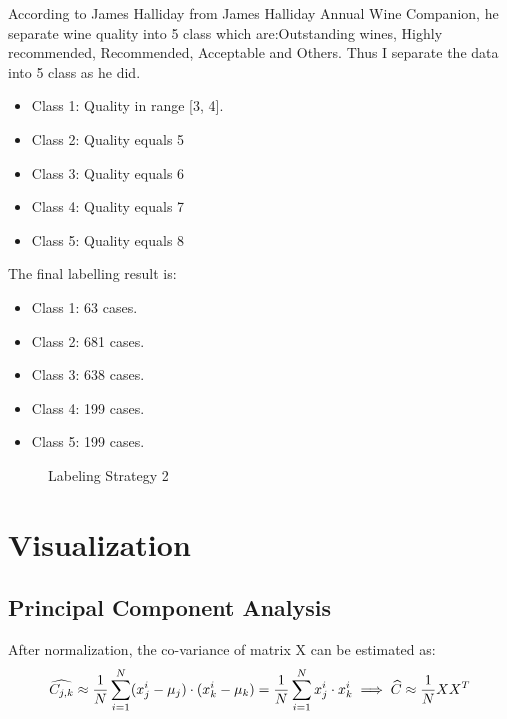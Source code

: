 \documentclass[titlepage,a4paper,12pt,thmsb]{report}
\begin{document}
According to James Halliday from James Halliday Annual Wine Companion, he separate wine quality into 5 class which are:Outstanding wines, Highly recommended, Recommended, Acceptable and Others. Thus I separate the data into 5 class as he did.
\begin{itemize}
\item{Class 1:  Quality in range [3, 4].}
\item{Class 2:  Quality equals 5}
\item{Class 3:  Quality equals 6}
\item{Class 4:  Quality equals 7}
\item{Class 5:  Quality equals 8}
\end{itemize}

The final labelling result is:

\begin{itemize}
\item{Class 1: 63 cases.}
\item{Class 2: 681 cases.}
\item{Class 3: 638 cases.}
\item{Class 4: 199 cases.}
\item{Class 5: 199 cases.}
\end{itemize}
\newpage
\begin{center}
\begin{figure}[hbtp]
{\par}
\caption{ Labeling Strategy 2}
\end{figure}
{}
\end{center}


\newpage

\section{Visualization}

\subsection{Principal Component Analysis}


After normalization, the co-variance of matrix X can be estimated as:
$$
  \widehat{C_{j,k}} \approx \frac{1}{N} \sum_{i=1}^{N} (x_j^i - \mu _j) \cdot (x_k^i - \mu_k) = \frac{1}{N} \sum_{i=1}^{N} x_j^i \cdot x_k^i \\
  \implies \widehat{C} \approx \frac{1}{N}XX^T
$$
\end{document}
